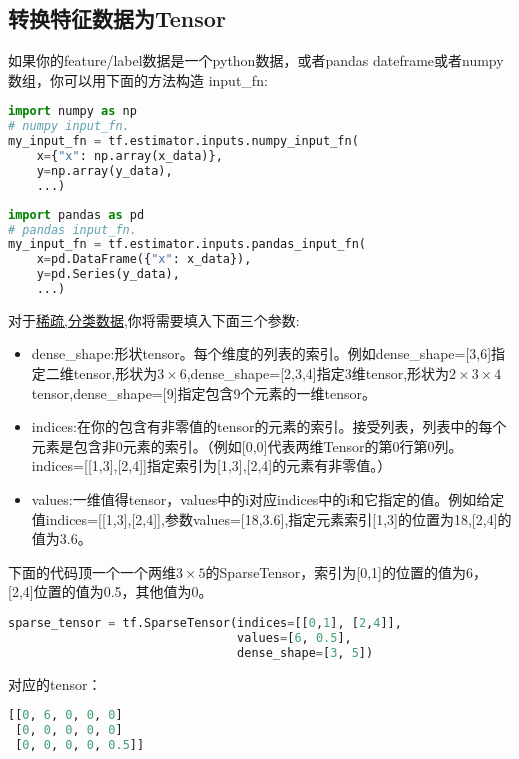 \subsection{转换特征数据为Tensor}
如果你的feature/label数据是一个python数据，或者pandas dateframe或者numpy数组，你可以用下面的方法构造
input\_fn:
\begin{lstlisting}[language=Python]
import numpy as np
# numpy input_fn.
my_input_fn = tf.estimator.inputs.numpy_input_fn(
    x={"x": np.array(x_data)},
    y=np.array(y_data),
    ...)
\end{lstlisting}
\begin{lstlisting}[language=Python]
import pandas as pd
# pandas input_fn.
my_input_fn = tf.estimator.inputs.pandas_input_fn(
    x=pd.DataFrame({"x": x_data}),
    y=pd.Series(y_data),
    ...)
\end{lstlisting}
对于\href{https://en.wikipedia.org/wiki/Sparse_matrix}{稀疏,分类数据},你将需要填入下面三个参数:
\begin{itemize}
    \item dense\_shape:形状tensor。每个维度的列表的索引。例如dense\_shape=[3,6]指定二维tensor,形状为$3\times6$,dense\_shape=[2,3,4]指定3维tensor,形状为$2\times3\times4$tensor,dense\_shape=[9]指定包含9个元素的一维tensor。
    \item indices:在你的包含有非零值的tensor的元素的索引。接受列表，列表中的每个元素是包含非0元素的索引。（例如[0,0]代表两维Tensor的第0行第0列。indices=[[1,3],[2,4]]指定索引为[1,3],[2,4]的元素有非零值。）
    \item values:一维值得tensor，values中的i对应indices中的i和它指定的值。例如给定值indices=[[1,3],[2,4]],参数values=[18,3.6],指定元素索引[1,3]的位置为18,[2,4]的值为3.6。
\end{itemize}
下面的代码顶一个一个两维$3\times5$的SparseTensor，索引为[0,1]的位置的值为6，[2,4]位置的值为0.5，其他值为0。
\begin{lstlisting}[language=Python]
sparse_tensor = tf.SparseTensor(indices=[[0,1], [2,4]],
                                values=[6, 0.5],
                                dense_shape=[3, 5])
\end{lstlisting}
对应的tensor：
\begin{lstlisting}[language=Python]
[[0, 6, 0, 0, 0]
 [0, 0, 0, 0, 0]
 [0, 0, 0, 0, 0.5]]
\end{lstlisting}

